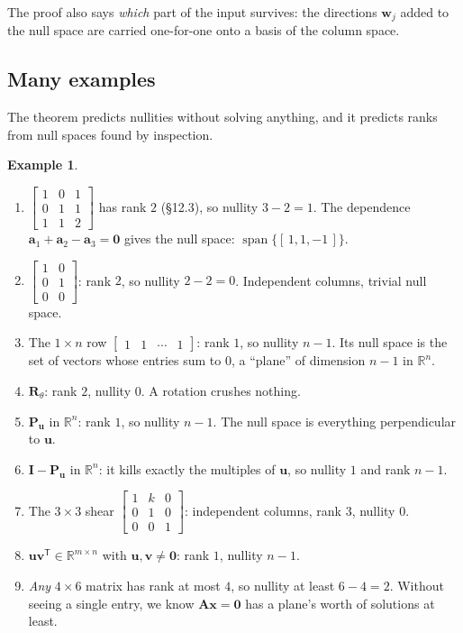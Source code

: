 \documentclass[11pt]{article}
\theoremstyle{plain}
\theoremstyle{definition}
\newtheorem{ex}{Example}[section]
\theoremstyle{remark}
\newcommand{\R}{\mathbb{R}}
\newcommand{\vc}[1]{\mathbf{#1}}
\newcommand{\mt}[1]{\mathbf{#1}}
\newcommand{\T}{^{\mathsf{T}}}
\DeclareMathOperator{\spanop}{span}
\begin{document}
\noindent The proof also says \emph{which} part of the input survives: the
directions $\vc{w}_j$ added to the null space are carried one-for-one onto a
basis of the column space.

\subsection{Many examples}
The theorem predicts nullities without solving anything, and it predicts ranks
from null spaces found by inspection.
\begin{ex}
\leavevmode
\begin{enumerate}[label=(\alph*),leftmargin=2em,itemsep=4pt]
  \item $\begin{bmatrix}1&0&1\\0&1&1\\1&1&2\end{bmatrix}$ has rank $2$ (\S12.3),
        so nullity $3-2=1$. The dependence $\vc{a}_1+\vc{a}_2-\vc{a}_3=\vc{0}$
        gives the null space: $\spanop\{[\,1,1,-1\,]\}$.
  \item $\begin{bmatrix}1&0\\0&1\\0&0\end{bmatrix}$: rank $2$, so nullity
        $2-2=0$. Independent columns, trivial null space.
  \item The $1\times n$ row $\begin{bmatrix}1&1&\cdots&1\end{bmatrix}$: rank $1$,
        so nullity $n-1$. Its null space is the set of vectors whose entries sum
        to $0$, a ``plane'' of dimension $n-1$ in $\R^{n}$.
  \item $\mt{R}_\theta$: rank $2$, nullity $0$. A rotation crushes nothing.
  \item $\mt{P}_{\vc{u}}$ in $\R^{n}$: rank $1$, so nullity $n-1$. The null
        space is everything perpendicular to $\vc{u}$.
  \item $\mt{I}-\mt{P}_{\vc{u}}$ in $\R^{n}$: it kills exactly the multiples
        of $\vc{u}$, so nullity $1$ and rank $n-1$.
  \item The $3\times3$ shear $\begin{bmatrix}1&k&0\\0&1&0\\0&0&1\end{bmatrix}$:
        independent columns, rank $3$, nullity $0$.
  \item $\vc{u}\vc{v}\T\in\R^{m\times n}$ with $\vc{u},\vc{v}\neq\vc{0}$: rank
        $1$, nullity $n-1$.
  \item \emph{Any} $4\times6$ matrix has rank at most $4$, so nullity at least
        $6-4=2$. Without seeing a single entry, we know $\mt{A}\vc{x}=\vc{0}$ has
        a plane's worth of solutions at least.
\end{enumerate}
\end{ex}
\end{document}
